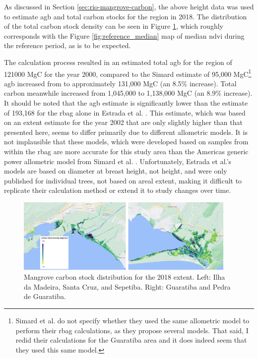As discussed in Section \ref{sec:rio-mangrove-carbon}, the above height data was used to estimate \ac{agb} and total carbon stocks for the region in 2018. The distribution of the total carbon stock density can be seen in Figure \ref{fig:carbon_density}, which roughly corresponds with the Figure \ref{fig:reference_median} map of median \ac{ndvi} during the reference period, as is to be expected. 

The calculation process resulted in an estimated total \ac{agb} for the region of 121000 MgC for the year 2000, compared to the Simard estimate of 95,000 MgC\footnote{Simard et al. do not specify whether they used the same allometric model to perform their \ac{rbag} calculations, as they propose several models. That said, I redid their calculations for the Guaratiba area and it does indeed seem that they used this same model.} \ac{agb} increased from to approximately 131,000 MgC (an 8.5\% increase). Total carbon meanwhile increased from 1,045,000 to 1,138,000 MgC (an 8.9\% increase). It should be noted that the \ac{agb} estimate is significantly lower than the estimate of 193,168 for the \ac{rbag} alone in Estrada et al. \cite{estradaEconomicEvaluationCarbon2015}. This estimate, which was based on an extent estimate for the year 2002 that are only slightly higher than that presented here, seems to differ primarily due to different allometric models. It is not implausible that these models, which were developed based on samples from within the \ac{rbag} are more accurate for this study area than the Americas generic power allometric model from Simard et al. \cite{simardMangroveCanopyHeight2019}. Unfortunately, Estrada et al.'s models are based on diameter at breast height, not height, and were only published for individual trees, not based on areal extent, making it difficult to replicate their calculation method or extend it to study changes over time. 

\begin{figure}[!htb] 
\centering
\includegraphics[width=0.95\textwidth]{Figures/chap4/carbon_density.png}
\caption[Mangrove Carbon Stock Distribution]{Mangrove carbon stock distribution for the 2018 extent. Left: Ilha da Madeira, Santa Cruz, and Sepetiba. Right: Guaratiba and Pedra de Guaratiba.}
\label{fig:carbon_density}
\end{figure}

